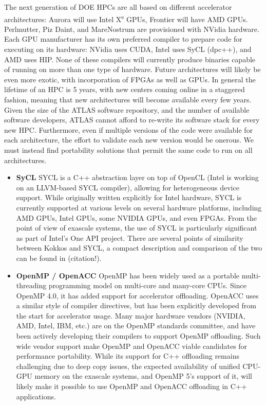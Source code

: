 \begin{itemize}
The next generation of DOE HPCs are all based on different
accelerator architectures: Aurora will use Intel X\textsuperscript{e} GPUs,
Frontier will have AMD GPUs. Perlmutter, Piz Daint, and MareNostrum 
are provisioned with NVidia hardware. Each GPU
manufacturer has its own preferred compiler to prepare code for
executing on its hardware: NVidia uses CUDA, Intel uses
SyCL (dpc++), and AMD uses HIP.  None of these compilers will
currently produce binaries capable of running on more than one type of
hardware.  Future architectures will likely be even more exotic,
with incorporation of FPGAs as well as GPUs.  In general the
lifetime of an HPC is 5 years, with new centers coming online in
a staggered fashion, meaning that new architectures will become
available every few years. Given the size of the ATLAS software
repository, and the number of available software developers,
ATLAS cannot afford to re-write its software stack for every new
HPC. Furthermore, even if multiple versions of the code were
available for each architecture, the effort to validate each new
version would be onerous. We must instead find portability
solutions that permit the same code to run on all architectures.

\begin{itemize}

\item {\bf SyCL}
SYCL is a C++ abstraction layer on top of OpenCL (Intel is
working on an LLVM-based SYCL compiler), allowing for
heterogeneous device support. While originally written explicitly
for Intel hardware, SYCL is currently supported at various levels
on several hardware platforms, including AMD GPUs, Intel GPUs,
some NVIDIA GPUs, and even FPGAs.  From the point of view of
exascale systems, the use of SYCL is particularly significant as
part of Intel's One API project. There are several points of
similarity between Kokkos and SYCL, a compact description and
comparison of the two can be found in (citation!).

\item {\bf OpenMP / OpenACC}
OpenMP has been widely used as a portable multi-threading
programming model on multi-core and many-core CPUs. Since OpenMP
4.0, it has added support for accelerator offloading. OpenACC uses
a similar style of compiler directives, but has been explicitly 
developed from the start for accelerator usage. Many major
hardware vendors (NVIDIA, AMD, Intel, IBM, etc.) are on the
OpenMP standards committee, and have been actively developing
their compilers to support OpenMP offloading. Such wide vendor
support make OpenMP and OpenACC viable candidates for performance
portability. While its support for C++ offloading remains
challenging due to deep copy issues, the expected availability of
unified CPU-GPU memory on the exascale systems, and OpenMP 5's
support of it, will likely make it possible to use OpenMP and OpenACC
offloading in C++ applications.


\end{itemize}
\end{itemize}

